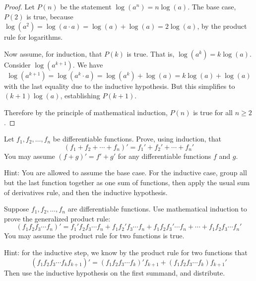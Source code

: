 \begin{questions}
\begin{answer}
		\begin{proof}
			Let $P(n)$ be the statement $\log(a^n) = n \log(a)$.  The base case, $P(2)$ is true, because $\log(a^2) = \log(a\cdot a) = \log(a) + \log(a) = 2\log(a)$, by the product rule for logarithms.
			
			Now assume, for induction, that $P(k)$ is true.  That is, $\log(a^k) = k\log(a)$.  Consider $\log(a^{k+1})$.  We have
			\[\log(a^{k+1}) = \log(a^k\cdot a) = \log(a^k) + \log(a) = k\log(a) + \log(a)\]
			with the last equality due to the inductive hypothesis.  But this simplifies to $(k+1) \log(a)$, establishing $P(k+1)$.
			
			Therefore by the principle of mathematical induction, $P(n)$ is true for all $n \ge 2$.	
		\end{proof}
	\end{answer}
	
	
\question Let $f_1, f_2,\ldots, f_n$ be differentiable functions.  Prove, using induction, that
\[(f_1 + f_2 + \cdots + f_n)' = f_1' + f_2' + \cdots + f_n'\]
You may assume $(f+g)' = f' + g'$ for any differentiable functions $f$ and $g$.

	\begin{answer}
		Hint: You are allowed to assume the base case.  For the inductive case, group all but the last function together as one sum of functions, then apply the usual sum of derivatives rule, and then the inductive hypothesis.
	\end{answer}


\question Suppose $f_1, f_2, \ldots, f_n$ are differentiable functions.  Use mathematical induction to prove the generalized product rule: 
\[(f_1 f_2 f_3 \cdots f_n)' = f_1' f_2 f_3 \cdots f_n + f_1 f_2' f_3 \cdots f_n + f_1 f_2 f_3' \cdots f_n + \cdots + f_1 f_2 f_3 \cdots f_n'\]
You may assume the product rule for two functions is true.

	\begin{answer}
		Hint: for the inductive step, we know by the product rule for two functions that \[(f_1f_2f_3 \cdots f_k f_{k+1})' = (f_1f_2f_3\cdots f_k)'f_{k+1} + (f_1f_2f_3\cdots f_k)f_{k+1}'\]
		Then use the inductive hypothesis on the first summand, and distribute.
	\end{answer}


 
\end{questions}



